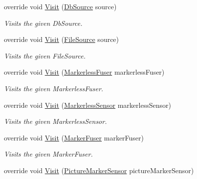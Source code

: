 \begin{DoxyCompactItemize}
override void \hyperlink{class_a_rdev_kit_1_1_controller_1_1_project_controller_1_1_export_visitor_a54481877bd367164a17916ff32f8da09}{Visit} (\hyperlink{class_a_rdev_kit_1_1_model_1_1_project_1_1_db_source}{Db\-Source} source)
\begin{DoxyCompactList}\small\item\em Visits the given Db\-Source. \end{DoxyCompactList}\item 
override void \hyperlink{class_a_rdev_kit_1_1_controller_1_1_project_controller_1_1_export_visitor_a078a2d0fef2fa5db4b6adcf4be50debe}{Visit} (\hyperlink{class_a_rdev_kit_1_1_model_1_1_project_1_1_file_source}{File\-Source} source)
\begin{DoxyCompactList}\small\item\em Visits the given File\-Source. \end{DoxyCompactList}\item 
override void \hyperlink{class_a_rdev_kit_1_1_controller_1_1_project_controller_1_1_export_visitor_aae0293dd695393b0037fb62f0f5a1d28}{Visit} (\hyperlink{class_a_rdev_kit_1_1_model_1_1_project_1_1_markerless_fuser}{Markerless\-Fuser} markerless\-Fuser)
\begin{DoxyCompactList}\small\item\em Visits the given Markerless\-Fuser. \end{DoxyCompactList}\item 
override void \hyperlink{class_a_rdev_kit_1_1_controller_1_1_project_controller_1_1_export_visitor_abf7c8bbff198ee8af664232c2fa394cb}{Visit} (\hyperlink{class_a_rdev_kit_1_1_model_1_1_project_1_1_markerless_sensor}{Markerless\-Sensor} markerless\-Sensor)
\begin{DoxyCompactList}\small\item\em Visits the given Markerless\-Sensor. \end{DoxyCompactList}\item 
override void \hyperlink{class_a_rdev_kit_1_1_controller_1_1_project_controller_1_1_export_visitor_a315b092cbd6a936b67d3ea690920bd95}{Visit} (\hyperlink{class_a_rdev_kit_1_1_model_1_1_project_1_1_marker_fuser}{Marker\-Fuser} marker\-Fuser)
\begin{DoxyCompactList}\small\item\em Visits the given Marker\-Fuser. \end{DoxyCompactList}\item 
override void \hyperlink{class_a_rdev_kit_1_1_controller_1_1_project_controller_1_1_export_visitor_a567d0ff197539453cc2c34b11f12ad59}{Visit} (\hyperlink{class_a_rdev_kit_1_1_model_1_1_project_1_1_picture_marker_sensor}{Picture\-Marker\-Sensor} picture\-Marker\-Sensor)

\end{DoxyCompactItemize}
